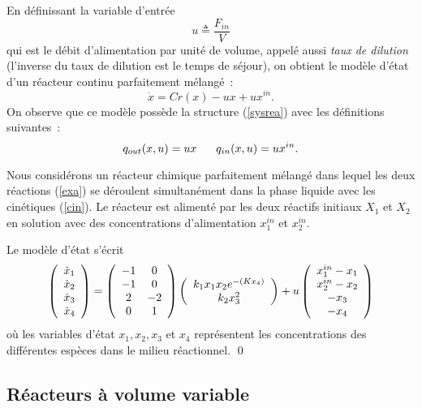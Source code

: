 En définissant la variable
d'entrée
$$ 
u \triangleq \frac{F_{in}}{V}
$$
qui est le débit d'alimentation par unité de volume, appelé aussi {\em taux de
dilution} (l'inverse du taux de dilution est le temps de séjour), on obtient le
modèle d'état d'un réacteur continu parfaitement mélangé~:
$$
\dot x = Cr(x) - ux + ux^{in}. \label{CSTR}
$$
On observe que ce modèle possède la structure (\ref{sysrea}) avec les
définitions suivantes~:
$$
q_{out}(x,u) = ux \hh \hh \hh q_{in}(x,u) = ux^{in}.
$$

\begin{exemple}{\blanc} \label{exempleCSTR}

Nous considérons un réacteur chimique parfaitement mélangé dans lequel
les deux réactions (\ref{exa}) se déroulent simultanément dans la
phase liquide avec les cinétiques (\ref{cin}).     Le réacteur est
alimenté par les deux réactifs initiaux $X_1$ et $X_2$ en solution avec des
concentrations d'alimentation
$x_1^{in}$ et $x_2^{in}$.

Le modèle d'état s'écrit
$$
\bma{c} \dot x_1 \\ \dot x_2 \\ \dot x_3 \\ \dot x_4 \ema =
\bma{cc} -1 & 0 \\ -1 & 0 \\ 2 & -2 \\ 0 & 1 \ema \bma{c}
k_1x_1x_2e^{-(Kx_4)} \\ k_2x_3^2 \ema 
 + u \bma{c} x_1^{in} -x_1 \\ x_2^{in} -x_2 \\ -x_3 \\ -x_4
\ema   
$$
où les variables d'état $x_1, x_2, x_3$ et $x_4$ représentent les
concentrations des différentes espèces dans le milieu réactionnel. \qed
\end{exemple}

\subsection{Réacteurs à volume variable}

